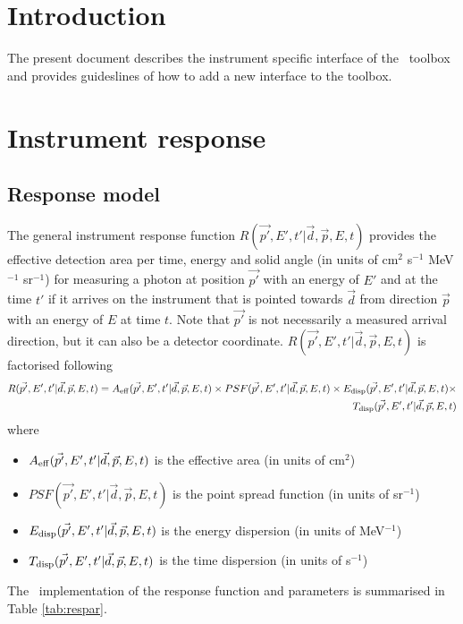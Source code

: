 \documentclass{article}[12pt,a4]
\begin{document}
\frontpage


\section{Introduction}

The present document describes the instrument specific interface of the \this\ toolbox
and provides guideslines of how to add a new interface to the toolbox.


\section{Instrument response}

\subsection{Response model}

The general instrument response function
$R(\vec{p'}, E', t' | \vec{d}, \vec{p}, E, t)$
provides the effective detection area per time, energy and solid angle
(in units of cm$^2$ s$^{-1}$ MeV$^{-1}$ sr$^{-1}$) 
for measuring a photon at position $\vec{p'}$ with an energy of $E'$ and at the time $t'$ if it 
arrives on the instrument that is pointed towards $\vec{d}$ from direction $\vec{p}$ with an 
energy of $E$ at time $t$.
Note that $\vec{p'}$ is not necessarily a measured arrival direction, but it can also be
a detector coordinate.
$R(\vec{p'}, E', t' | \vec{d}, \vec{p}, E, t)$ is factorised following
\begin{eqnarray}
R(\vec{p'}, E', t' | \vec{d}, \vec{p}, E, t) = 
A_{\rm eff}(\vec{p'}, E', t' | \vec{d}, \vec{p}, E, t) \times
PSF(\vec{p'}, E', t' | \vec{d}, \vec{p}, E, t) \times
E_{\rm disp}(\vec{p'}, E', t' | \vec{d}, \vec{p}, E, t) \times \nonumber \\
T_{\rm disp}(\vec{p'}, E', t' | \vec{d}, \vec{p}, E, t)
\label{eq:rspfact}
\end{eqnarray}
where
\begin{itemize}
\item[] $A_{\rm eff}(\vec{p'}, E', t' | \vec{d}, \vec{p}, E, t)$ is the effective area (in units of cm$^2$)
\item[] $PSF(\vec{p'}, E', t' | \vec{d}, \vec{p}, E, t)$ is the point spread function (in units of sr$^{-1}$)
\item[] $E_{\rm disp}(\vec{p'}, E', t' | \vec{d}, \vec{p}, E, t)$ is the energy dispersion (in units of MeV$^{-1}$)
\item[] $T_{\rm disp}(\vec{p'}, E', t' | \vec{d}, \vec{p}, E, t)$ is the time dispersion (in units of s$^{-1}$)
\end{itemize}
The \this\ implementation of the response function and parameters is summarised in 
Table \ref{tab:respar}.
\end{document}
